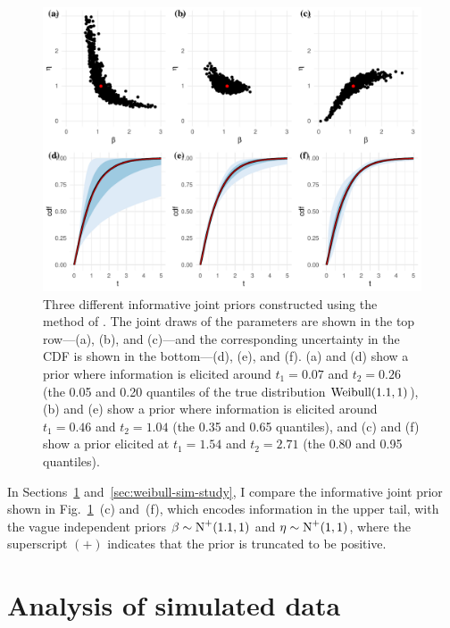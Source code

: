 \begin{figure}
    \centering
    \includegraphics[width=1\textwidth]{./figures/ch-2/joint-priors.pdf}
    \caption{Three different informative joint priors constructed using the method of \citet{kaminskiy2005}. The joint draws of the parameters are shown in the top row---(a), (b), and (c)---and the corresponding uncertainty in the CDF is shown in the bottom---(d), (e), and (f). (a) and (d) show a prior where information is elicited around $t_1 = 0.07$ and $t_2 = 0.26$ (the 0.05 and 0.20 quantiles of the true distribution $\hbox{Weibull}(1.1, 1)$), (b) and (e) show a prior where information is elicited around $t_1 = 0.46$ and $t_2 = 1.04$ (the 0.35 and 0.65 quantiles), and (c) and (f) show a prior elicited at $t_1 = 1.54$ and $t_2 = 2.71$ (the 0.80 and 0.95 quantiles).}
    \label{fig:kaminskiy-join-priors}
\end{figure}

In Sections~\ref{sec:weibull-sim-example} and~\ref{sec:weibull-sim-study}, I compare the informative joint prior shown in Fig.~\ref{fig:kaminskiy-join-priors}~(c) and~(f), which encodes information in the upper tail, with the vague independent priors $\beta \sim \hbox{N}^{+}(1.1, 1)$ and $\eta \sim \hbox{N}^{+}(1, 1)$, where the superscript $(+)$ indicates that the prior is truncated to be positive. 

\section{Analysis of simulated data} \label{sec:weibull-sim-example}


